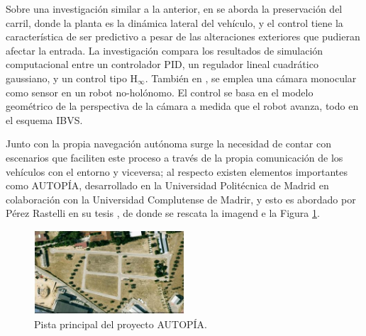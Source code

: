 \par Sobre una investigación similar a la anterior, en \cite{leeSynthesisRobustLane2018} se aborda la preservación del carril, donde la planta es la dinámica lateral del vehículo, y el control tiene la característica de ser predictivo a pesar de las alteraciones exteriores que pudieran afectar la entrada. La investigación compara los resultados de simulación computacional entre un controlador PID, un regulador lineal cuadrático gaussiano, y un control tipo H$_{\infty}$. También en \cite{mackunisUnifiedTrackingRegulation2014}, se emplea una cámara monocular como sensor en un robot no-holónomo. El control se basa en el modelo geométrico de la perspectiva de la cámara a medida que el robot avanza, todo en el esquema IBVS.
\par Junto con la propia navegación autónoma surge la necesidad de contar con escenarios que faciliten este proceso a través de la propia comunicación de los vehículos con el entorno y viceversa; al respecto existen elementos importantes como AUTOPÍA, desarrollado en la Universidad Politécnica de Madrid en colaboración con la Universidad Complutense de Madrir, y esto es abordado por Pérez Rastelli en su tesis \cite{joshuemanuelperezrastelliAgentesControlVehiculos2012}, de donde se rescata la imagend e la Figura \ref{fig:Autopia}.
\begin{figure}[htbp!]
	\centering
	\includegraphics[width=0.5\textwidth]{./Figuras/AUTOPIA}
	\caption{Pista principal del proyecto AUTOPÍA.}
	\label{fig:Autopia}
\end{figure}